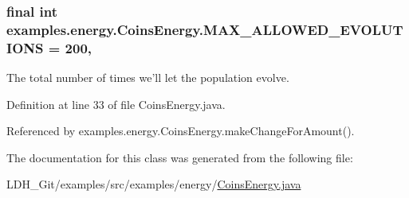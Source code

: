 \hypertarget{classexamples_1_1energy_1_1_coins_energy_a1c4eabfda7d3e4b77309afda15f3057b}{
\subsubsection[{M\-A\-X\-\_\-\-A\-L\-L\-O\-W\-E\-D\-\_\-\-E\-V\-O\-L\-U\-T\-I\-O\-N\-S}]{\setlength{\rightskip}{0pt plus 5cm}final int examples.\-energy.\-Coins\-Energy.\-M\-A\-X\-\_\-\-A\-L\-L\-O\-W\-E\-D\-\_\-\-E\-V\-O\-L\-U\-T\-I\-O\-N\-S = 200\hspace{0.3cm}{\ttfamily [static]}, {\ttfamily [private]}}}\label{classexamples_1_1energy_1_1_coins_energy_a1c4eabfda7d3e4b77309afda15f3057b}
The total number of times we'll let the population evolve. 

Definition at line 33 of file Coins\-Energy.\-java.



Referenced by examples.\-energy.\-Coins\-Energy.\-make\-Change\-For\-Amount().



The documentation for this class was generated from the following file\-:\begin{DoxyCompactItemize}
\item 
L\-D\-H\-\_\-\-Git/examples/src/examples/energy/\hyperlink{_coins_energy_8java}{Coins\-Energy.\-java}\end{DoxyCompactItemize}
